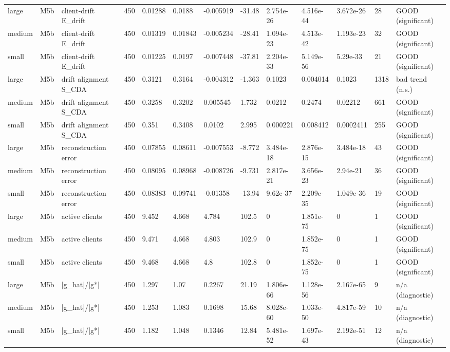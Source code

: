 \begin{table}[t]
\begin{tabular}{lllllllllllll}
large & M5b & client-drift E\_drift & 450 & 0.01288 & 0.0188 & -0.005919 & -31.48 & 2.754e-26 & 4.516e-44 & 3.672e-26 & 28 & GOOD (significant) \\
medium & M5b & client-drift E\_drift & 450 & 0.01319 & 0.01843 & -0.005234 & -28.41 & 1.094e-23 & 4.513e-42 & 1.193e-23 & 32 & GOOD (significant) \\
small & M5b & client-drift E\_drift & 450 & 0.01225 & 0.0197 & -0.007448 & -37.81 & 2.204e-33 & 5.149e-56 & 5.29e-33 & 21 & GOOD (significant) \\
large & M5b & drift alignment S\_CDA & 450 & 0.3121 & 0.3164 & -0.004312 & -1.363 & 0.1023 & 0.004014 & 0.1023 & 1318 & bad trend (n.s.) \\
medium & M5b & drift alignment S\_CDA & 450 & 0.3258 & 0.3202 & 0.005545 & 1.732 & 0.0212 & 0.2474 & 0.02212 & 661 & GOOD (significant) \\
small & M5b & drift alignment S\_CDA & 450 & 0.351 & 0.3408 & 0.0102 & 2.995 & 0.000221 & 0.008412 & 0.0002411 & 255 & GOOD (significant) \\
large & M5b & reconstruction error & 450 & 0.07855 & 0.08611 & -0.007553 & -8.772 & 3.484e-18 & 2.876e-15 & 3.484e-18 & 43 & GOOD (significant) \\
medium & M5b & reconstruction error & 450 & 0.08095 & 0.08968 & -0.008726 & -9.731 & 2.817e-21 & 3.656e-23 & 2.94e-21 & 36 & GOOD (significant) \\
small & M5b & reconstruction error & 450 & 0.08383 & 0.09741 & -0.01358 & -13.94 & 9.62e-37 & 2.209e-35 & 1.049e-36 & 19 & GOOD (significant) \\
large & M5b & active clients & 450 & 9.452 & 4.668 & 4.784 & 102.5 & 0 & 1.851e-75 & 0 & 1 & GOOD (significant) \\
medium & M5b & active clients & 450 & 9.471 & 4.668 & 4.803 & 102.9 & 0 & 1.852e-75 & 0 & 1 & GOOD (significant) \\
small & M5b & active clients & 450 & 9.468 & 4.668 & 4.8 & 102.8 & 0 & 1.852e-75 & 0 & 1 & GOOD (significant) \\
large & M5b & |g\_hat|/|g*| & 450 & 1.297 & 1.07 & 0.2267 & 21.19 & 1.806e-66 & 1.128e-56 & 2.167e-65 & 9 & n/a (diagnostic) \\
medium & M5b & |g\_hat|/|g*| & 450 & 1.253 & 1.083 & 0.1698 & 15.68 & 8.028e-60 & 1.033e-50 & 4.817e-59 & 10 & n/a (diagnostic) \\
small & M5b & |g\_hat|/|g*| & 450 & 1.182 & 1.048 & 0.1346 & 12.84 & 5.481e-52 & 1.697e-43 & 2.192e-51 & 12 & n/a (diagnostic) \\

\end{tabular}
\end{table}
